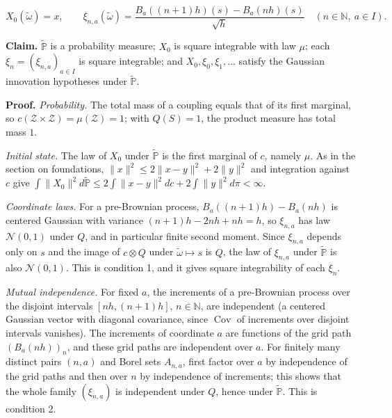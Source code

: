 \documentclass[11pt,a4paper]{report}
\begin{document}
\[X_0(\tilde\omega)=x,\qquad\xi_{n,a}(\tilde\omega)=\frac{B_a((n+1)h)(s)-B_a(nh)(s)}{\sqrt h}\quad(n\in\mathbb N,\ a\in I).\]


\textbf{Claim.} \(\tilde{\mathbb P}\) is a probability measure; \(X_0\) is square integrable with law \(\mu\); each \(\xi_n=(\xi_{n,a})_{a\in I}\) is square integrable; and \(X_0,\xi_0,\xi_1,\dots\) satisfy the Gaussian innovation hypotheses under \(\tilde{\mathbb P}\).




\textbf{Proof.} \emph{Probability.} The total mass of a coupling equals that of its first marginal, so \(c(\mathcal Z\times\mathcal Z)=\mu(\mathcal Z)=1\); with \(Q(S)=1\), the product measure has total mass \(1\).




\emph{Initial state.} The law of \(X_0\) under \(\tilde{\mathbb P}\) is the first marginal of \(c\), namely \(\mu\). As in the section on foundations, \(\|x\|^2\le2\|x-y\|^2+2\|y\|^2\) and integration against \(c\) give \(\int\|X_0\|^2d\tilde{\mathbb P}\le2\int\|x-y\|^2dc+2\int\|y\|^2d\pi<\infty\).




\emph{Coordinate laws.} For a pre-Brownian process, \(B_a((n+1)h)-B_a(nh)\) is centered Gaussian with variance \((n+1)h-2nh+nh=h\), so \(\xi_{n,a}\) has law \(\mathcal N(0,1)\) under \(Q\), and in particular finite second moment. Since \(\xi_{n,a}\) depends only on \(s\) and the image of \(c\otimes Q\) under \(\tilde\omega\mapsto s\) is \(Q\), the law of \(\xi_{n,a}\) under \(\tilde{\mathbb P}\) is also \(\mathcal N(0,1)\). This is condition 1, and it gives square integrability of each \(\xi_n\).




\emph{Mutual independence.} For fixed \(a\), the increments of a pre-Brownian process over the disjoint intervals \([nh,(n+1)h]\), \(n\in\mathbb N\), are independent (a centered Gaussian vector with diagonal covariance, since \(\operatorname{Cov}\) of increments over disjoint intervals vanishes). The increments of coordinate \(a\) are functions of the grid path \((B_a(nh))_n\), and these grid paths are independent over \(a\). For finitely many distinct pairs \((n,a)\) and Borel sets \(A_{n,a}\), first factor over \(a\) by independence of the grid paths and then over \(n\) by independence of increments; this shows that the whole family \((\xi_{n,a})\) is independent under \(Q\), hence under \(\tilde{\mathbb P}\). This is condition 2.
\end{document}
